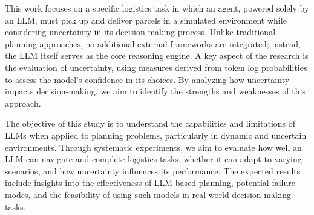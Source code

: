 This work focuses on a specific logistics task in which an agent, powered solely
by an LLM, must pick up and deliver parcels in a simulated environment while considering
uncertainty in its decision-making process. Unlike traditional planning
approaches, no additional external frameworks are integrated; instead, the LLM itself
serves as the core reasoning engine. A key aspect of the research is the
evaluation of uncertainty, using measures derived from token log probabilities to
assess the model's confidence in its choices. By analyzing how uncertainty
impacts decision-making, we aim to identify the strengths and weaknesses of this
approach.

The objective of this study is to understand the capabilities and limitations of
LLMs when applied to planning problems, particularly in dynamic and uncertain
environments. Through systematic experiments, we aim to evaluate how well an LLM
can navigate and complete logistics tasks, whether it can adapt to varying scenarios,
and how uncertainty influences its performance. The expected results include insights
into the effectiveness of LLM-based planning, potential failure modes, and the feasibility
of using such models in real-world decision-making tasks.

